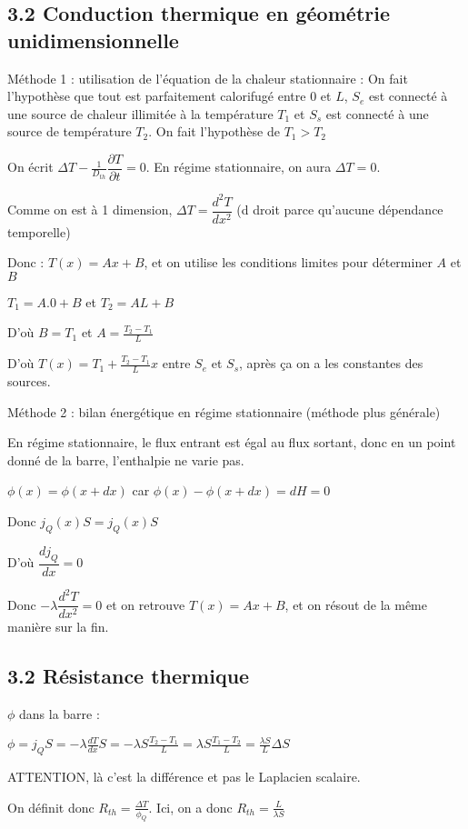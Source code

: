 \documentclass[a4paper,12pt]{book}
\begin{document}
\subsection{3.2 Conduction thermique en géométrie unidimensionnelle}
Méthode 1 : utilisation de l'équation de la chaleur stationnaire : On fait l'hypothèse que tout est parfaitement calorifugé entre $0$ et $L$, $S_e$ est connecté à une source de chaleur illimitée à la température $T_1$ et $S_s$ est connecté à une source de température $T_2$. On fait l'hypothèse de $T_1>T_2$
\par On écrit $\Delta T - \frac{1}{D_{th}}\dfrac{\partial T}{\partial t}=0$. En régime stationnaire, on aura $\Delta T = 0$. \par Comme on est à 1 dimension, $\Delta T = \dfrac{d^2 T}{dx^2}$ (d droit parce qu'aucune dépendance temporelle) \par Donc : $T(x) =  Ax + B$, et on utilise les conditions limites pour déterminer $A$ et $B$ \par $T_1 = A.0 + B$ et $T_2 = AL+B$ \par D'où $B=T_1$ et $A = \frac{T_2-T_1}{L}$ \par D'où $T(x) = T_1 + \frac{T_2-T_1}{L}x$ entre $S_e$ et $S_s$, après ça on a les constantes des sources.

\par Méthode 2 : bilan énergétique en régime stationnaire (méthode plus générale)
\par En régime stationnaire, le flux entrant est égal au flux sortant, donc en un point donné de la barre, l'enthalpie ne varie pas. \par $\phi(x) = \phi(x+dx)$ car $\phi(x)-\phi(x+dx)=dH = 0$ \par Donc $j_Q(x)S = j_Q(x)S$ \par D'où $\dfrac{dj_Q}{dx}=0$ \par Donc $-\lambda\dfrac{d^2T}{dx^2}=0$ et on retrouve $T(x)=Ax+B$, et on résout de la même manière sur la fin.

\subsection{3.2 Résistance thermique}
$\phi$ dans la barre : \par $\phi = j_QS = -\lambda\frac{dT}{dx}S = -\lambda S\frac{T_2-T_1}{L} =\lambda S\frac{T_1-T_2}{L}=\frac{\lambda S}{L}\Delta S$ \par ATTENTION, là c'est la différence et pas le Laplacien scalaire. \par On définit donc $R_{th}= \frac{\Delta T}{\phi_Q}$. Ici, on a donc $R_{th}=\frac{L}{\lambda S}$
\end{document}
